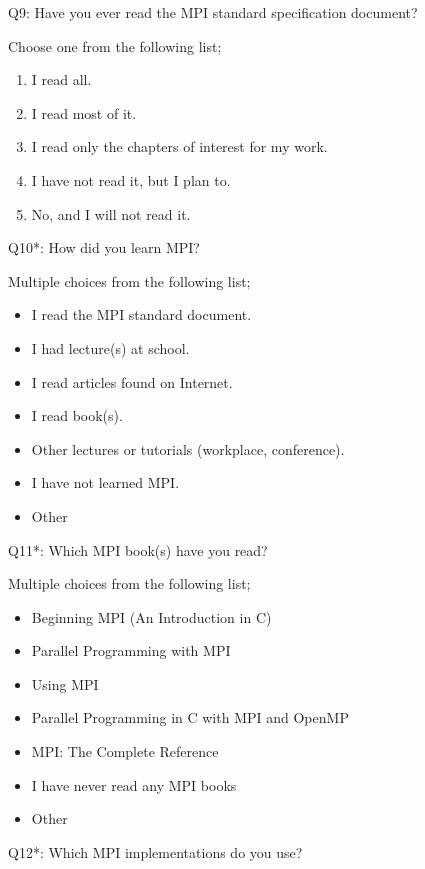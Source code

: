 \begin{description}
\item{Q9:} Have you ever read the MPI standard specification document?

Choose one from the following list;
\begin{enumerate}
\item I read all.
\item I read most of it.
\item I read only the chapters of interest for my work.
\item I have not read it, but I plan to.
\item No, and I will not read it.
\end{enumerate}

\item{Q10*:} How did you learn MPI?

Multiple choices from the following list;
\begin{itemize}
\item I read the MPI standard document.
\item I had lecture(s) at school.
\item I read articles found on Internet.
\item I read book(s).
\item Other lectures or tutorials (workplace, conference).
\item I have not learned MPI.
\item Other
\end{itemize}

\item{Q11*:} Which MPI book(s) have you read?

Multiple choices from the following list;
\begin{itemize}
\item Beginning MPI (An Introduction in C)
\item Parallel Programming with MPI
\item Using MPI
\item Parallel Programming in C with MPI and OpenMP
\item MPI: The Complete Reference
\item I have never read any MPI books
\item Other
\end{itemize}

\item{Q12*:} Which MPI implementations do you use?


\end{description}
